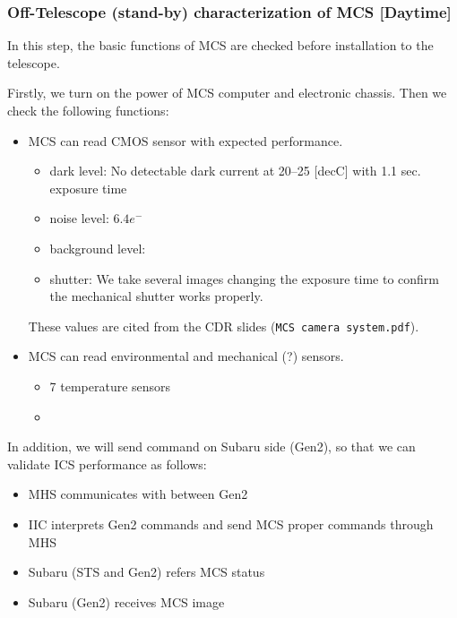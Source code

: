 \subsubsection{Off-Telescope (stand-by) characterization of MCS [Daytime]}\label{secflow:MCSoff}
In this step, the basic functions of MCS are checked before installation to the telescope.

Firstly, we turn on the power of MCS computer and electronic chassis.
Then we check the following functions:

\begin{itemize}
\item MCS can read CMOS sensor with expected performance.
	\begin{itemize}
	\item dark level: No detectable dark current at 20--25 [decC] with 1.1 sec. exposure time
	\item noise level: $6.4 e^-$
	\item background level: 
	\item shutter: We take several images changing the exposure time to confirm the mechanical shutter works properly.
	\end{itemize}
These values are cited from the CDR slides ({\tt MCS camera system.pdf}).
\item MCS can read environmental and mechanical (?) sensors.
	\begin{itemize}
	\item 7 temperature sensors 
	\item {}
	\end{itemize}
\end{itemize}

In addition, we will send command on Subaru side (Gen2), so that we can validate ICS performance as follows:
\begin{itemize}
\item MHS communicates with between Gen2
\item IIC interprets Gen2 commands and send MCS proper commands through MHS
\item Subaru (STS and Gen2) refers MCS status 
\item Subaru (Gen2) receives MCS image
\end{itemize}

